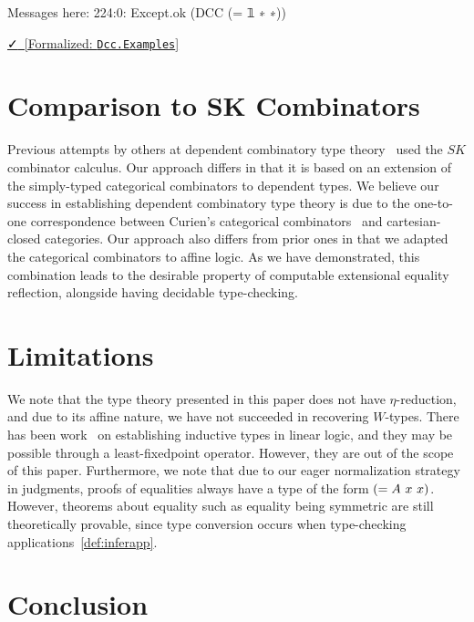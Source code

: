 \documentclass{lmcs}
\newcommand{\leanlink}[2]{
  \href{#1}{\textcolor{black}\faCheck~[Formalized: \texttt{#2}]}%
}
\begin{document}
\begin{leancode}
Messages here:
224:0:
Except.ok (DCC (= 𝟙 ∗ ∗))
\end{leancode}

\noindent \leanlink{https://github.com/lexzaiello/DCC/blob/k-lean-comp-type-check/Dcc/Examples.lean}{Dcc.Examples}

\section{Comparison to SK Combinators}

Previous attempts by others at dependent combinatory type theory~\cite{altenkirch} used the \(SK\) combinator calculus. Our approach differs in that it is based on an extension of the simply-typed categorical combinators to dependent types. We believe our success in establishing dependent combinatory type theory is due to the one-to-one correspondence between Curien's categorical combinators~\cite{CURIEN1986188} and cartesian-closed categories. Our approach also differs from prior ones in that we adapted the categorical combinators to affine logic. As we have demonstrated, this combination leads to the desirable property of computable extensional equality reflection, alongside having decidable type-checking.

\section{Limitations}

We note that the type theory presented in this paper does not have \(\eta\)-reduction, and due to its affine nature, we have not succeeded in recovering \(W\)-types. There has been work~\cite{fu2023calculus} on establishing inductive types in linear logic, and they may be possible through a least-fixedpoint operator. However, they are out of the scope of this paper. Furthermore, we note that due to our eager normalization strategy in judgments, proofs of equalities always have a type of the form \(\comb[= A][x][x]\). However, theorems about equality such as equality being symmetric are still theoretically provable, since type conversion occurs when type-checking applications~\ref{def:inferapp}.

\section{Conclusion}
\end{document}

